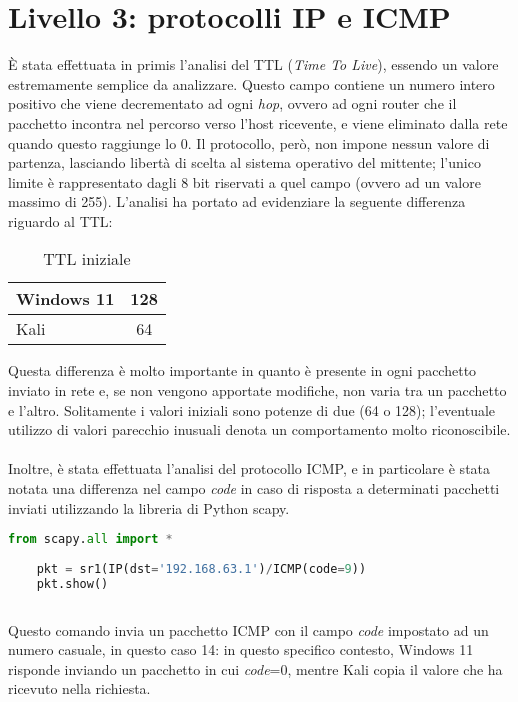 \section{Livello 3: protocolli IP e ICMP}
È stata effettuata in primis l'analisi del TTL (\textit{Time To Live}), essendo un valore estremamente semplice da analizzare.
Questo campo contiene un numero intero positivo che viene decrementato ad ogni \textit{hop}, ovvero ad ogni router che il pacchetto incontra nel percorso verso l'host ricevente, e viene eliminato dalla rete quando questo raggiunge lo 0.
Il protocollo, però, non impone nessun valore di partenza, lasciando libertà di scelta al sistema operativo del mittente; l'unico limite è rappresentato dagli 8 bit riservati a quel campo (ovvero ad un valore massimo di 255).
L'analisi ha portato ad evidenziare la seguente differenza riguardo al TTL:
\begin{table}[H]
	\centering
	\begin{tabular}{| l | c |}
		\hline
		\rowcolor{blue!10} Windows 11 & 128
		\\
		\hline
		\rowcolor{red!10} Kali & 64
		\\
		\hline
		
	\end{tabular}
	\caption{TTL iniziale}
	\label{tab:TTL}
\end{table}

Questa differenza è molto importante in quanto è presente in ogni pacchetto inviato in rete e, se non vengono apportate modifiche, non varia tra un pacchetto e l'altro. Solitamente i valori iniziali sono potenze di due (64 o 128); l'eventuale utilizzo di valori parecchio inusuali denota un comportamento molto riconoscibile.
\\
\\
Inoltre, è stata effettuata l'analisi del protocollo ICMP, e in particolare è stata notata una differenza nel campo \textit{code} in caso di risposta a determinati pacchetti inviati utilizzando la libreria di Python scapy.

\begin{lstlisting}[language=Python, caption={Comando Python per l'invio del pacchetto}]
	from scapy.all import *
	
	pkt = sr1(IP(dst='192.168.63.1')/ICMP(code=9))
	pkt.show()
	
\end{lstlisting}
Questo comando invia un pacchetto ICMP con il campo \textit{code} impostato ad un numero casuale, in questo caso 14: in questo specifico contesto, Windows 11 risponde inviando un pacchetto in cui \textit{code}=0, mentre Kali copia il valore che ha ricevuto nella richiesta.

